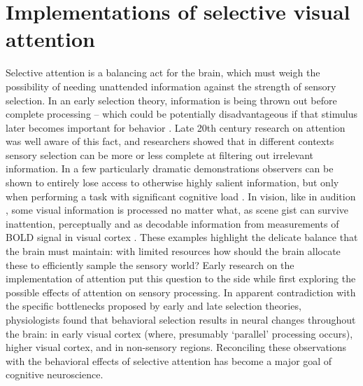 \section{Implementations of selective visual attention}

Selective attention is a balancing act for the brain, which must weigh the possibility of needing unattended information against the strength of sensory selection. In an early selection theory, information is being thrown out before complete processing -- which could be potentially disadvantageous if that stimulus later becomes important for behavior \citep{Mack1998-nq}. Late 20th century research on attention was well aware of this fact, and researchers showed that in different contexts sensory selection can be more or less complete at filtering out irrelevant information. In a few particularly dramatic demonstrations \citep{Haines1991-si,Mack1998-nq,Neisser1979-mm,Simons1999-ng} observers can be shown to entirely lose access to otherwise highly salient information, but only when performing a task with significant cognitive load \citep{Lavie2005-aw,Lavie2004-ub,Rees1997-hd}. In vision, like in audition \citep{Moray1959-fn}, some visual information is processed no matter what, as scene gist can survive inattention, perceptually \citep{Li2002-ji} and as decodable information from measurements of BOLD signal in visual cortex \citep{Peelen2009-us}. These examples highlight the delicate balance that the brain must maintain: with limited resources how should the brain allocate these to efficiently sample the sensory world? Early research on the implementation of attention put this question to the side while first exploring the possible effects of attention on sensory processing. In apparent contradiction with the specific bottlenecks proposed by early and late selection theories, physiologists found that behavioral selection results in neural changes throughout the brain: in early visual cortex (where, presumably `parallel' processing occurs), higher visual cortex, and in non-sensory regions. Reconciling these observations with the behavioral effects of selective attention has become a major goal of cognitive neuroscience. 

